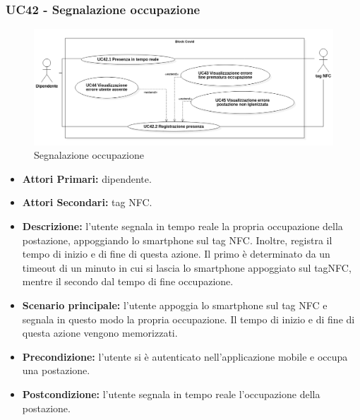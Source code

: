 \subsubsection{ UC42 - Segnalazione occupazione}
\begin{figure}[H]
	\centering
	\includegraphics[width=18cm]{res/images/UC42-43-44-45.png}
	\caption{Segnalazione occupazione}
	\label{fig:Segnalazione occupazione }
\end{figure}
\begin{itemize}
	\item\textbf{Attori Primari:} dipendente.
	\item\textbf{Attori Secondari:} tag NFC.
	\item\textbf{Descrizione:} l’utente segnala in tempo reale la propria occupazione della postazione, appoggiando lo smartphone sul tag NFC. Inoltre, registra il tempo di inizio e di fine di questa azione. Il primo è determinato da un timeout di un minuto in cui si lascia lo smartphone appoggiato sul tagNFC, mentre il secondo dal tempo di fine occupazione.
	\item\textbf{Scenario principale:} l’utente appoggia lo smartphone sul tag NFC e segnala in questo modo la propria occupazione.
	Il tempo di inizio e di fine di questa azione vengono memorizzati.
	\item\textbf{Precondizione:} l’utente si è autenticato nell'applicazione mobile e occupa una postazione.
	\item\textbf{Postcondizione:} l’utente segnala in tempo reale l'occupazione della postazione.
\end{itemize}

